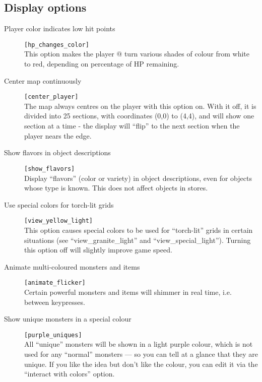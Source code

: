 \subsection{Display options}
\begin{description}
\item[Player color indicates low hit points]
\verb+[hp_changes_color]+\\
    This option makes the player @ turn various shades of colour from white
    to red, depending on percentage of HP remaining.

\item[Center map continuously] \verb+[center_player]+\\
    The map always centres on the player with this option on. With it off, it
    is divided into 25 sections, with coordinates (0,0) to (4,4), and will
    show one section at a time - the display will ``flip'' to the next section
    when the player nears the edge.

\item[Show flavors in object descriptions] \verb+[show_flavors]+\\
    Display ``flavors'' (color or variety) in object descriptions, even for
    objects whose type is known. This does not affect objects in stores.

\item[Use special colors for torch-lit grids]
\verb+[view_yellow_light]+\\
    This option causes special colors to be used for ``torch-lit'' grids in
    certain situations (see ``view\_granite\_light'' and
    ``view\_special\_light'').
    Turning this option off will slightly improve game speed.

\item[Animate multi-coloured monsters and items]
\verb+[animate_flicker]+\\
    Certain powerful monsters and items will shimmer in real time, i.e.
    between keypresses.

\item[Show unique monsters in a special colour]
\verb+[purple_uniques]+\\
    All ``unique'' monsters will be shown in a light purple colour, which
    is not used for any ``normal'' monsters --- so you can tell at a glance
    that they are unique. If you like the idea but don't like the colour,
    you can edit it via the ``interact with colors'' option.
\end{description}

